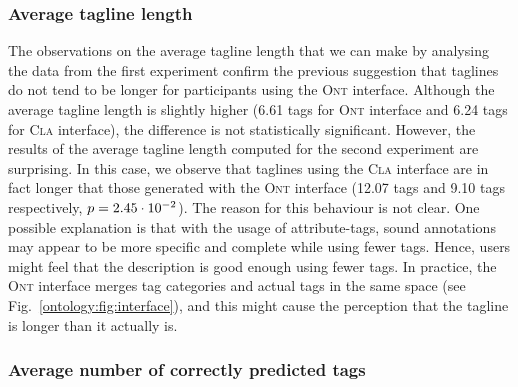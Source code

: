 \subsubsection{Average tagline length}



The observations on the average tagline length that we can make by analysing the data from the first experiment confirm the previous suggestion that taglines do not tend to be longer for participants using the \textsc{Ont} interface. Although the average tagline length is slightly higher (6.61 tags for \textsc{Ont} interface and 6.24 tags for \textsc{Cla} interface), the difference is not statistically significant.
However, the results of the average tagline length computed for the second experiment are surprising. In this case, we observe that taglines using the \textsc{Cla} interface are in fact longer that those generated with the \textsc{Ont} interface (12.07 tags and 9.10 tags respectively, $p = 2.45\cdot 10^{-2}$).
The reason for this behaviour is not clear. One possible explanation is that with the usage of attribute-tags, sound annotations may appear to be more specific and complete while using fewer tags. Hence, users might feel that the description is good enough using fewer tags. In practice, the \textsc{Ont} interface merges tag categories and actual tags in the same space (see Fig.~\ref{ontology:fig:interface}), and this might cause the perception that the tagline is longer than it actually is.



\subsubsection{Average number of correctly predicted tags}


